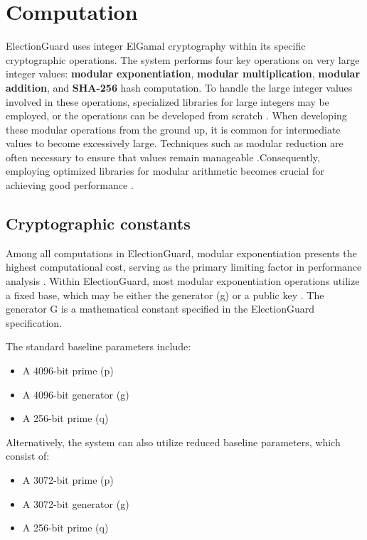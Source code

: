 \section{Computation}
ElectionGuard uses integer ElGamal cryptography within its specific cryptographic operations. The system performs four key operations on very large integer values: \textbf{modular exponentiation}, \textbf{modular multiplication}, \textbf{modular addition}, and \textbf{SHA-256} hash computation. To handle the large integer values involved in these operations, specialized libraries for large integers may be employed, or the operations can be developed from scratch \cite[21, 25-26]{eg-spec}. When developing these modular operations from the ground up, it is common for intermediate values to become excessively large. Techniques such as modular reduction are often necessary to ensure that values remain manageable \cite[21, 25-26]{eg-spec}.Consequently, employing optimized libraries for modular arithmetic becomes crucial for achieving good performance \cite[22]{eg-paper}.

\subsection{Cryptographic constants}
Among all computations in ElectionGuard, modular exponentiation presents the highest computational cost, serving as the primary limiting factor in performance analysis \cite[22]{eg-spec}. Within ElectionGuard, most modular exponentiation operations utilize a fixed base, which may be either the generator (g) or a public key \cite[22]{eg-paper}. The generator G is a mathematical constant specified in the ElectionGuard specification.

The standard baseline parameters include:
\begin{itemize}
    \item A 4096-bit prime (p) \cite[22]{eg-spec}
    \item A 4096-bit generator (g) \cite[23]{eg-spec}
    \item A 256-bit prime (q) \cite[21]{eg-spec}
\end{itemize}

Alternatively, the system can also utilize reduced baseline parameters, which consist of:
\begin{itemize}
    \item A 3072-bit prime (p) \cite[36]{eg-spec}
    \item A 3072-bit generator (g) \cite[36-37]{eg-spec}
    \item A 256-bit prime (q) \cite[36]{eg-spec}
\end{itemize}

